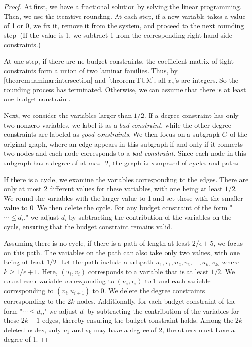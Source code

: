 \documentclass[11pt,a4paper]{article} \usepackage{enumitem}
\theoremstyle{definition}
\begin{document}
\begin{proof}
At first, we have a fractional solution by solving the linear programming.
Then, we use the iterative rounding. At each step, if a new variable takes a value of 1 or 0, we fix it, remove it from the system, and proceed to the next rounding step. 
(If the value is 1, we subtract 1 from the corresponding right-hand side constraints.)

At one step, if there are no budget constraints, the coefficient matrix of tight constraints form a union of two laminar families. Thus, by \cref{theorem:laminar:intersection} and \cref{theorem:TUM}, all $x_e$'s are integers. So the rounding process has terminated. Otherwise, we can assume that there is at least one budget constraint.

Next, we consider the variables larger than $1/2$. 
If a degree constraint has only two nonzero variables, we label it as a {\em bad constraint}, while the other degree constraints are labeled as {\em good constraints}.
We then focus on a subgraph $G$ of the original graph, where an edge appears in this subgraph if and only if it connects two nodes and each node corresponds to a {\em bad constraint}. Since each node in this subgraph has a degree of at most 2, the graph is composed of cycles and paths.

If there is a cycle, we examine the variables corresponding to the edges. There are only at most $2$ different values for these variables, with one being at least $1/2$. We round the variables with the larger value to 1 and set those with the smaller value to 0. We then delete the cycle. For any budget constraint of the form "$\cdots \leq d_i$," we adjust $d_i$ by subtracting the contribution of the variables on the cycle, ensuring that the budget constraint remains valid.

Assuming there is no cycle, if there is a path of length at least $2/\epsilon + 5$, we focus on this path. The variables on the path can also take only two values, with one being at least $1/2$. Let the path include a subpath $u_1,v_1,u_2,v_2,\ldots,u_k,v_k$, where $k \geq 1/\epsilon + 1$. Here, $(u_i,v_i)$ corresponds to a variable that is at least $1/2$. We round each variable corresponding to $(u_i,v_i)$ to 1 and each variable corresponding to $(v_i,u_{i+1})$ to 0. We delete the degree constraints corresponding to the $2k$ nodes. Additionally, for each budget constraint of the form "$\cdots \leq d_i$," we adjust $d_i$ by subtracting the contribution of the variables for these $2k-1$ edges, thereby ensuring the budget constraint holds. Among the $2k$ deleted nodes, only $u_1$ and $v_k$ may have a degree of 2; the others must have a degree of 1.


\end{proof}
\end{document}

